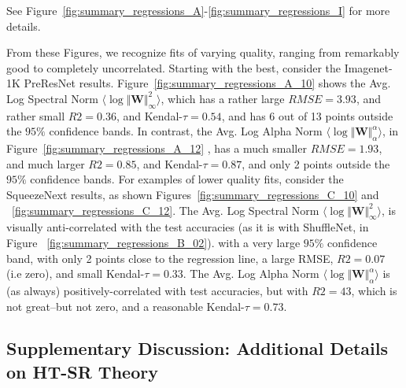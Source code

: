 See
Figure~\ref{fig:summary_regressions_A}-\ref{fig:summary_regressions_I} for more details.

From these Figures, we recognize fits of varying quality, ranging from remarkably good to completely uncorrelated.
Starting with the best, consider the Imagenet-1K PreResNet results.  Figure~\ref{fig:summary_regressions_A_10} shows 
the Avg. Log Spectral Norm $\langle\log\Vert\mathbf{W}\Vert^{2}_{\infty}\rangle$, 
which has a rather large $RMSE=3.93$, and rather small $R2=0.36$, and Kendal-$\tau=0.54$, and
has 6 out of 13 points outside the $95\%$ confidence bands.  In contrast, 
the Avg. Log Alpha Norm $\langle\log\Vert\mathbf{W}\Vert^{\alpha}_{\alpha}\rangle$, 
in  Figure~\ref{fig:summary_regressions_A_12} , 
has a much smaller $RMSE=1.93$, and much larger  $R2=0.85$, and Kendal-$\tau=0.87$, 
and only 2 points outside the $95\%$ confidence bands.
For examples of lower quality fits, consider the SqueezeNext results, as shown Figures~\ref{fig:summary_regressions_C_10} and 
~\ref{fig:summary_regressions_C_12}.  
The Avg. Log Spectral Norm $\langle\log\Vert\mathbf{W}\Vert^{2}_{\infty}\rangle$,
is visually anti-correlated  with the test accuracies
(as it is with ShuffleNet, in Figure ~\ref{fig:summary_regressions_B_02}).
with a very large $95\%$ confidence band, with only 2 points close to the regression line,
a large RMSE,  $R2=0.07$ (i.e zero), and small Kendal-$\tau=0.33$.
The Avg. Log Alpha Norm $\langle\log\Vert\mathbf{W}\Vert^{\alpha}_{\alpha}\rangle$ is (as always) positively-correlated
with test accuracies, but with $R2=43$, which is not great--but not zero, and a reasonable Kendal-$\tau=0.73$.













\subsection{Supplementary Discussion: Additional Details on HT-SR Theory}

